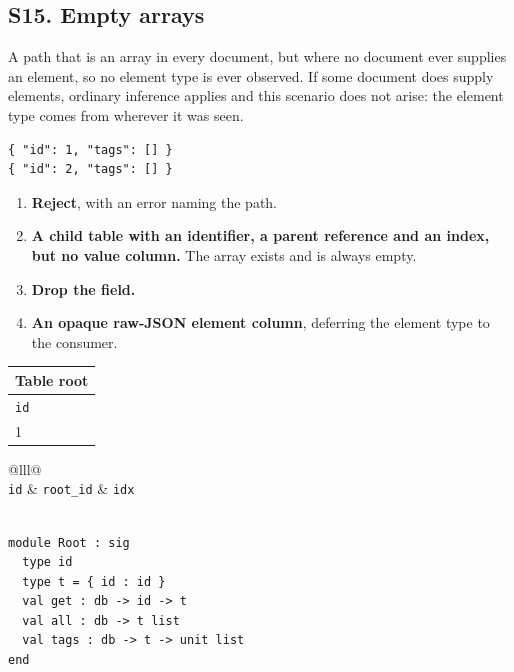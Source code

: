 \subsection*{S15. Empty arrays}

A path that is an array in every document, but where no document ever supplies
an element, so no element type is ever observed. If some document does supply
elements, ordinary inference applies and this scenario does not arise: the
element type comes from wherever it was seen.

\begin{lstlisting}[style=json]
{ "id": 1, "tags": [] }
{ "id": 2, "tags": [] }
\end{lstlisting}

\options
\begin{enumerate}[label=\textbf{(\alph*)}]
  \item \textbf{Reject}, with an error naming the path.
  \item \textbf{A child table with an identifier, a parent reference and an
        index, but no value column.} The array exists and is always empty.
        \selected
  \item \textbf{Drop the field.}
  \item \textbf{An opaque raw-JSON element column}, deferring the element type
        to the consumer.
\end{enumerate}


\begin{center}
\begin{tabular}{@{}l@{}}
\textbf{Table root} \\
\hline
\texttt{id} \\
\hline
1 \\
\hline
\end{tabular}
\qquad
\begin{tabular}{@{}lll@{}}
 \\
\hline
\texttt{id} & \texttt{root\_id} & \texttt{idx} \\
\hline
{} \\
\hline
\end{tabular}
\end{center}

\begin{lstlisting}[style=ml]
module Root : sig
  type id
  type t = { id : id }
  val get : db -> id -> t
  val all : db -> t list
  val tags : db -> t -> unit list
end
\end{lstlisting}

